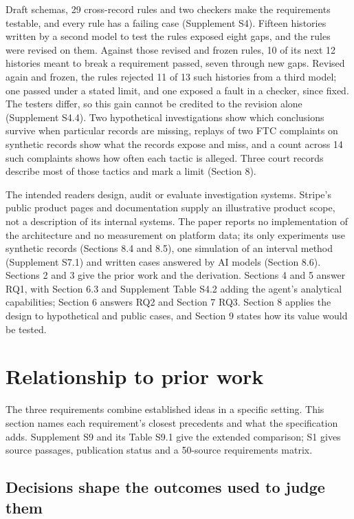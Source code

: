 \documentclass[acmlarge,review,anonymous,nonacm]{acmart}
\begin{document}
Draft schemas, 29 cross-record rules and two checkers make the
requirements testable, and every rule has a failing case (Supplement
S4). Fifteen histories written by a second model to test the rules
exposed eight gaps, and the rules were revised on them. Against those
revised and frozen rules, 10 of its next 12 histories meant to break a
requirement passed, seven through new gaps. Revised again and frozen,
the rules rejected 11 of 13 such histories from a third model; one
passed under a stated limit, and one exposed a fault in a checker, since
fixed. The testers differ, so this gain cannot be credited to the
revision alone (Supplement S4.4). Two hypothetical investigations show
which conclusions survive when particular records are missing, replays
of two FTC complaints on synthetic records show what the records expose
and miss, and a count across 14 such complaints shows how often each
tactic is alleged. Three court records describe most of those tactics
and mark a limit (Section 8).

The intended readers design, audit or evaluate investigation systems.
Stripe's public product pages and documentation supply an illustrative
product scope, not a description of its internal systems. The paper
reports no implementation of the architecture and no measurement on
platform data; its only experiments use synthetic records (Sections 8.4
and 8.5), one simulation of an interval method (Supplement S7.1) and
written cases answered by AI models (Section 8.6). Sections 2 and 3 give
the prior work and the derivation. Sections 4 and 5 answer RQ1, with
Section 6.3 and Supplement Table S4.2 adding the agent's analytical
capabilities; Section 6 answers RQ2 and Section 7 RQ3. Section 8 applies
the design to hypothetical and public cases, and Section 9 states how
its value would be tested.

\hypertarget{relationship-to-prior-work}{%
\section{Relationship to prior work}\label{relationship-to-prior-work}}

The three requirements combine established ideas in a specific setting.
This section names each requirement's closest precedents and what the
specification adds. Supplement S9 and its Table S9.1 give the extended
comparison; S1 gives source passages, publication status and a 50-source
requirements matrix.

\hypertarget{decisions-shape-the-outcomes-used-to-judge-them}{%
\subsection{Decisions shape the outcomes used to judge
them}\label{decisions-shape-the-outcomes-used-to-judge-them}}
\end{document}

